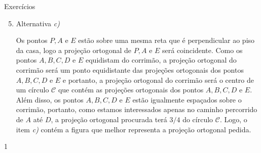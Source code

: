 \begin{answer}{Exercícios}
{\exerciselist
\begin{enumerate}\setcounter{enumi}{4}
\item Alternativa \textit{c)}

Os pontos \(P, A\) e \(E\) estão sobre uma mesma reta que é perpendicular ao piso da casa, logo a projeção ortogonal de \(P, A\) e \(E\) será coincidente. Como os pontos \(A, B, C, D\) e \(E\) equidistam do corrimão, a projeção ortogonal do corrimão será um ponto equidistante das projeções ortogonais dos pontos \(A, B, C, D\) e \(E\) e portanto, a projeção ortogonal do corrimão será o centro de um círculo \(\mathcal C\) que contém as projeções ortogonais dos pontos \(A, B, C, D\) e \(E\). Além disso, os pontos \(A, B, C, D\) e \(E\) estão igualmente espaçados sobre o corrimão, portanto, como estamos interessados apenas no caminho percorrido de \(A\) até \(D\), a projeção ortogonal procurada terá \(3/4\) do círculo \(\mathcal C\). Logo, o item \textit{c)} contém a figura que melhor representa a projeção ortogonal pedida.
\end{enumerate}
}{1}
\end{answer}
\clearmargin

